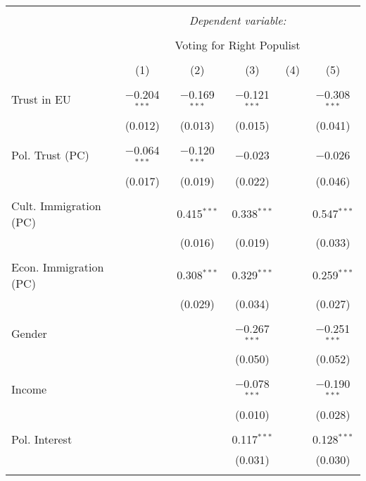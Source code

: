 
\begin{table}[!htbp] \centering 
  \caption{} 
  \label{} 
\begin{tabular}{@{\extracolsep{5pt}}lccccc} 
\\[-1.8ex]\hline 
\hline \\[-1.8ex] 
 & \multicolumn{5}{c}{\textit{Dependent variable:}} \\ 
\cline{2-6} 
\\[-1.8ex] & \multicolumn{5}{c}{Voting for Right Populist} \\ 
\\[-1.8ex] & (1) & (2) & (3) & (4) & (5)\\ 
\hline \\[-1.8ex] 
 Trust in EU & $-$0.204$^{***}$ & $-$0.169$^{***}$ & $-$0.121$^{***}$ &  & $-$0.308$^{***}$ \\ 
  & (0.012) & (0.013) & (0.015) &  & (0.041) \\ 
  & & & & & \\ 
 Pol. Trust (PC) & $-$0.064$^{***}$ & $-$0.120$^{***}$ & $-$0.023 &  & $-$0.026 \\ 
  & (0.017) & (0.019) & (0.022) &  & (0.046) \\ 
  & & & & & \\ 
 Cult. Immigration (PC) &  & 0.415$^{***}$ & 0.338$^{***}$ &  & 0.547$^{***}$ \\ 
  &  & (0.016) & (0.019) &  & (0.033) \\ 
  & & & & & \\ 
 Econ. Immigration (PC) &  & 0.308$^{***}$ & 0.329$^{***}$ &  & 0.259$^{***}$ \\ 
  &  & (0.029) & (0.034) &  & (0.027) \\ 
  & & & & & \\ 
 Gender &  &  & $-$0.267$^{***}$ &  & $-$0.251$^{***}$ \\ 
  &  &  & (0.050) &  & (0.052) \\ 
  & & & & & \\ 
 Income &  &  & $-$0.078$^{***}$ &  & $-$0.190$^{***}$ \\ 
  &  &  & (0.010) &  & (0.028) \\ 
  & & & & & \\ 
 Pol. Interest &  &  & 0.117$^{***}$ &  & 0.128$^{***}$ \\ 
  &  &  & (0.031) &  & (0.030) \\ 
  & & & & & \\ 

\end{tabular}
\end{table}
